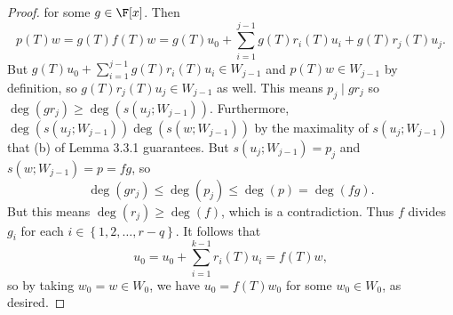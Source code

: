 \documentclass[math_245.tex]{subfiles}
\begin{document}
\begin{proof}
        for some $g\in\F[x]$. Then
        \begin{equation*}
            p(T)w = g(T)f(T)w = g(T)u_0 + \sum^{j-1}_{i=1} g(T)r_i(T)u_i + g(T)r_j(T)u_j.
        \end{equation*}
        But $g(T)u_0+\sum^{j-1}_{i=1} g(T)r_i(T)u_i\in W_{j-1}$ and $p(T)w\in W_{j-1}$ by definition, so $g(T)r_j(T)u_j\in W_{j-1}$ as well. This means $p_j\mid gr_j$ so $\deg\left( gr_j \right) \geq \deg\left( s\left( u_j;W_{j-1} \right) \right)$. Furthermore, $\deg\left( s\left( u_j;W_{j-1} \right)  \right) \deg\left( s\left( w;W_{j-1} \right)  \right)$ by the maximality of $s\left( u_j;W_{j-1} \right) $ that (b) of Lemma 3.3.1 guarantees. But $s\left( u_j;W_{j-1} \right) = p_j$ and $s\left( w;W_{j-1} \right) = p = fg$, so
        \begin{equation*}
            \deg\left( gr_j \right) \leq \deg\left( p_j \right) \leq \deg(p) = \deg(fg).
        \end{equation*}
        But this means $\deg\left( r_j \right) \geq \deg(f)$, which is a contradiction. Thus $f$ divides $g_i$ for each $i\in\left\lbrace 1,2,\ldots,r-q \right\rbrace $. It follows that
        \begin{equation*}
            u_0 = u_0 + \sum^{k-1}_{i=1} r_i(T)u_i = f(T)w,
        \end{equation*}
        so by taking $w_0=w\in W_0$, we have $u_0 = f(T)w_0$ for some $w_0\in W_0$, as desired.
    \end{proof}

\end{document}
